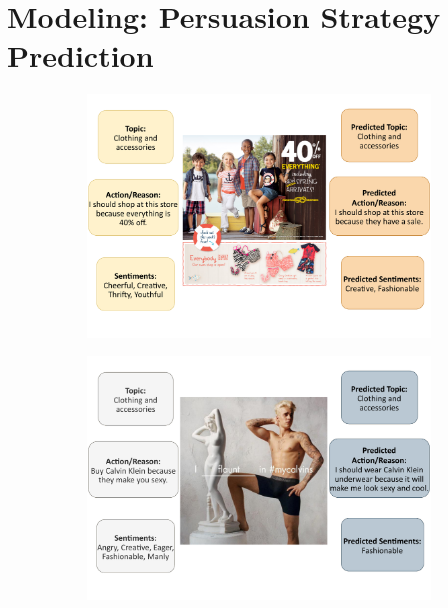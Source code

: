 \documentclass[hidelinks,11pt,a4paper]{report}
\begin{document}
\section{Modeling: Persuasion Strategy Prediction}
\label{sec:Persuasion Strategy Prediction Model}


\begin{figure}[!h]
    \centering
    \begin{subfigure}[b]{0.49\textwidth}
         \centering
         \includegraphics[width=\textwidth,scale=0.68]{images/preds_sup_1.pdf}
         \caption{}
         \label{fig:preds-sup-1}
     \end{subfigure}
     \begin{subfigure}[b]{0.49\textwidth}
         \centering
         \includegraphics[width=\textwidth,scale=0.68]{images/preds_sup_2.pdf}

\end{subfigure}
\end{figure}
\end{document}
